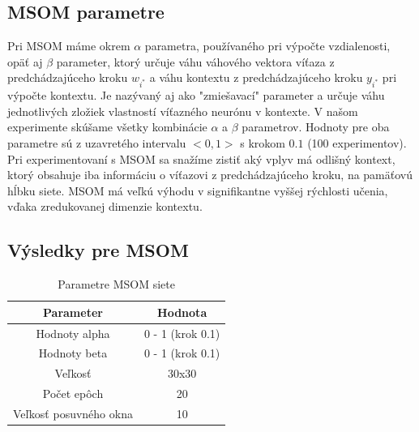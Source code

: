 \subsection{MSOM parametre}
Pri MSOM máme okrem $\alpha$ parametra, používaného pri výpočte vzdialenosti, opäť aj $\beta$ parameter, ktorý určuje váhu
váhového vektora víťaza z predchádzajúceho kroku $w_{i^{*}}$ a váhu kontextu
z predchádzajúceho kroku $y_{i^{*}}$ pri výpočte kontextu. Je nazývaný aj ako "zmiešavací" parameter
a určuje váhu jednotlivých zložiek vlastností víťazného neurónu v kontexte.
V našom experimente skúšame všetky kombinácie $\alpha$ a $\beta$ parametrov.
Hodnoty pre oba parametre sú z uzavretého intervalu $<0, 1>$ s krokom $0.1$ (100 experimentov).
Pri experimentovaní s MSOM sa snažíme zistiť aký vplyv má odlišný kontext, ktorý obsahuje iba informáciu
o víťazovi z predchádzajúceho kroku, na pamäťovú hĺbku siete. MSOM má veľkú výhodu v signifikantne 
vyššej rýchlosti učenia, vďaka zredukovanej dimenzie kontextu.

\subsection{Výsledky pre MSOM}

\begin{table}[h!]
    \centering
    \begin{tabular}{|c|c|} 
     \hline
     Parameter & Hodnota \\ 
     \hline\hline
     Hodnoty alpha & 0 - 1 (krok 0.1)  \\ 
     \hline
     Hodnoty beta & 0 - 1  (krok 0.1) \\ 
     \hline
     Veľkosť & 30x30  \\
     \hline
     Počet epôch & 20  \\
     \hline
     Veľkosť posuvného okna & 10  \\
     \hline
    \end{tabular}
    \caption{Parametre MSOM siete}
    \label{table:1}
    \end{table}
    
